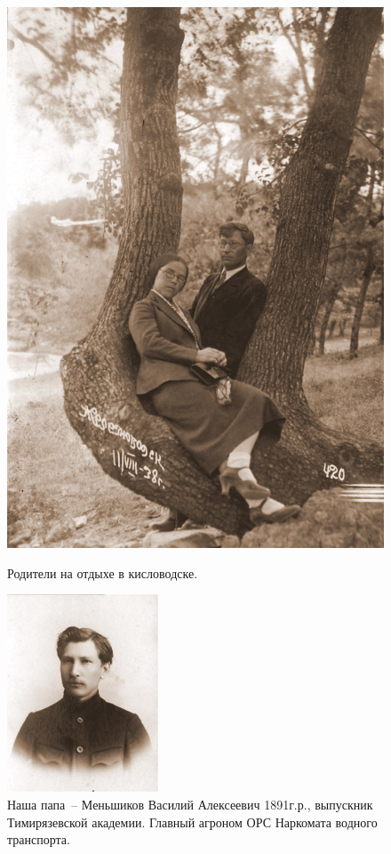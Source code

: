 \documentclass[utf8x, 12pt]{G7-32a} %
\begin{document}
\begin{figure}[h!]
\begin{minipage}[h]{70mm}
       \includegraphics[width=\linewidth]{inc/Menshekovy/12.jpg} 
       \caption{Родители на отдыхе в кисловодске.}
   \end{minipage}
   \hfill
    \begin{minipage}[h!]{50mm}
        \begin{center}
        \includegraphics[width=45mm]{inc/Menshekovy/13a.JPG}
        \end{center}
        \caption{Наша папа~-- Меньшиков Василий Алексеевич 1891г.р., выпускник Тимирязевской академии. Главный агроном ОРС Наркомата водного транспорта.}
    \end{minipage}

\end{figure}
\end{document}
